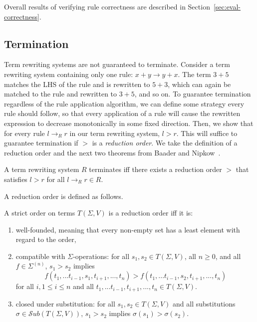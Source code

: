 \documentclass[sigplan,10pt,review,anonymous]{acmart}\settopmatter{printfolios=true,printccs=false,printacmref=false}
\begin{document}
Overall results of verifying rule correctness are described in Section~\ref{sec:eval-correctness}.

\subsection{Termination}

Term rewriting systems are not guaranteed to terminate. Consider a term
rewriting system containing only one rule: $x + y \rightarrow y + x$. The term
$3 + 5$ matches the LHS of the rule and is rewritten to $5 + 3$, which can again
be matched to the rule and rewritten to $3 + 5$, and so on. To guarantee
termination regardless of the rule application algorithm, we can define some strategy
every rule should follow, so that every application of a rule will cause the rewritten expression to
decrease monotonically in some fixed direction. Then, we show that for every rule $l \rightarrow_R r$ in our
term rewriting system, $l > r$. This will suffice to guarantee termination if $>$ is a \emph{reduction
  order}. We take the definition of a reduction order and the next two theorems from Baader and Nipkow~\cite{baader1999term}.

\begin{theorem}\label{theorem:terminates}
A term rewriting system $R$ terminates iff there exists a reduction order $>$ that satisfies $l > r$ for all $l \rightarrow_R r \in R$.
\end{theorem}

A reduction order is defined as follows.

\begin{definition}
A strict order on terms $T(\Sigma, V)$ is a reduction order iff it is: 
\begin{enumerate}
    \item well-founded, meaning that every non-empty set has a least element with regard to the order,
    \item compatible with $\Sigma$-operations: for all $s_1, s_2 \in T(\Sigma,V)$, all $n \geq 0$, and all $f \in \Sigma^{(n)}$, $s_1 > s_2$ implies
    \[ f(t_1,...t_{i-1},s_1,t_{i+1},...,t_n) > f(t_1,...t_{i-1},s_2,t_{i+1},...,t_n)
    \]
    for all $i, 1 \leq i \leq n$ and all $t_1,...t_{i-1},t_{i+1},...,t_n \in T(\Sigma,V)$.
    \item closed under substitution: for all $s_1, s_2 \in T(\Sigma,V)$ and all substitutions $\sigma \in \mathcal{S}ub(T(\Sigma,V))$, $s_1 > s_2$ implies $\sigma(s_1) > \sigma(s_2)$.
\end{enumerate}
\end{definition}
\end{document}
